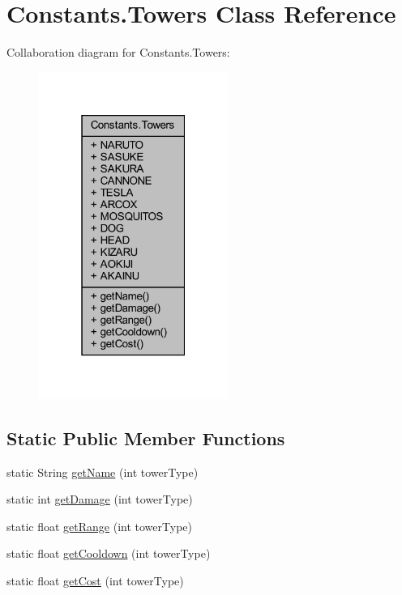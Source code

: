 \hypertarget{classhelpz_1_1_constants_1_1_towers}{}\section{Constants.\+Towers Class Reference}
\label{classhelpz_1_1_constants_1_1_towers}


Collaboration diagram for Constants.\+Towers\+:\nopagebreak
\begin{figure}[H]
\begin{center}
\leavevmode
\includegraphics[width=175pt]{classhelpz_1_1_constants_1_1_towers__coll__graph}
\end{center}
\end{figure}
\subsection*{Static Public Member Functions}
\begin{DoxyCompactItemize}
\item 
static String \hyperlink{classhelpz_1_1_constants_1_1_towers_a514d43d9440f939e8a4d021a01049424}{get\+Name} (int tower\+Type)
\item 
static int \hyperlink{classhelpz_1_1_constants_1_1_towers_af342377601401ede304d4f859942472c}{get\+Damage} (int tower\+Type)
\item 
static float \hyperlink{classhelpz_1_1_constants_1_1_towers_add957f88d7d8a05be491699abca0ee95}{get\+Range} (int tower\+Type)
\item 
static float \hyperlink{classhelpz_1_1_constants_1_1_towers_a4779d2fa0a45586ca954aa438b1851e0}{get\+Cooldown} (int tower\+Type)
\item 
static float \hyperlink{classhelpz_1_1_constants_1_1_towers_affe7d154c2065c3c8eea74993d932c2c}{get\+Cost} (int tower\+Type)
\end{DoxyCompactItemize}
